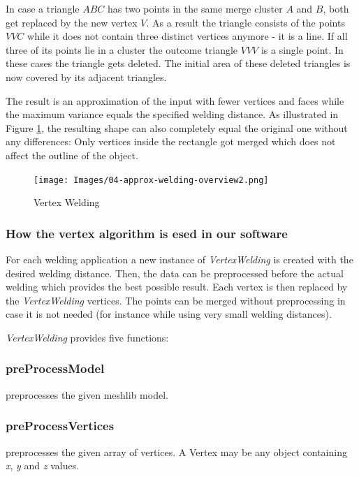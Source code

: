 \documentclass[../ClassicThesis.tex]{subfiles}
\begin{document}
In case a triangle $ABC$ has two points in the same merge cluster $A$ and $B$, both get replaced by the new vertex $V$. As a result the triangle consists of the points $VVC$ while it does not contain three distinct vertices anymore - it is a line. If all three of its points lie in a cluster the outcome triangle $VVV$ is a single point. In these cases the triangle gets deleted. The initial area of these deleted triangles is now covered by its adjacent triangles.

The result is an approximation of the input with fewer vertices and faces while the maximum variance equals the specified welding distance. As illustrated in Figure \ref{fig:vertex_welding}, the resulting shape can also completely equal the original one without any differences: Only vertices inside the rectangle got merged which does not affect the outline of the object.



\begin{figure}
\texttt{[image: Images/04-approx-welding-overview2.png]}
\caption{Vertex Welding}
\label{fig:vertex_welding}
\end{figure}

\subsubsection{How the vertex algorithm is esed in our software}

For each welding application a new instance of \emph{VertexWelding} is created with the desired welding distance. Then, the data can be preprocessed before the actual welding which provides the best possible result. Each vertex is then replaced by the \emph{VertexWelding} vertices. The points can be merged without preprocessing in case it is not needed (for instance while using very small welding distances). 

\emph{VertexWelding} provides five functions:

\subsubsection*{preProcessModel}

preprocesses the given meshlib model.

\subsubsection*{preProcessVertices}

preprocesses the given array of vertices. A Vertex may be any object containing \emph{x}, \emph{y} and \emph{z} values.
\end{document}
